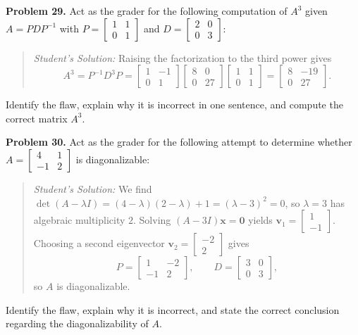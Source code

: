 \documentclass[11pt, letterpaper]{article}
\theoremstyle{definition}
\theoremstyle{remark}
\begin{document}
\textbf{Problem 29.}\label{prob:29}
Act as the grader for the following computation of $A^{3}$ given $A = PDP^{-1}$ with $P = \begin{bmatrix} 1 & 1 \\ 0 & 1 \end{bmatrix}$ and $D = \begin{bmatrix} 2 & 0 \\ 0 & 3 \end{bmatrix}$:
\begin{quote}
\emph{Student's Solution:} Raising the factorization to the third power gives
\[
A^{3} = P^{-1}D^{3}P = \begin{bmatrix} 1 & -1 \\ 0 & 1 \end{bmatrix} \begin{bmatrix} 8 & 0 \\ 0 & 27 \end{bmatrix} \begin{bmatrix} 1 & 1 \\ 0 & 1 \end{bmatrix} = \begin{bmatrix} 8 & -19 \\ 0 & 27 \end{bmatrix}.
\]
\end{quote}
Identify the flaw, explain why it is incorrect in one sentence, and compute the correct matrix $A^{3}$.

\textbf{Problem 30.}\label{prob:30}
Act as the grader for the following attempt to determine whether $A = \begin{bmatrix} 4 & 1 \\ -1 & 2 \end{bmatrix}$ is diagonalizable:
\begin{quote}
\emph{Student's Solution:} We find $\det(A - \lambda I) = (4-\lambda)(2-\lambda) + 1 = (\lambda - 3)^{2} = 0$, so $\lambda = 3$ has algebraic multiplicity $2$. Solving $(A - 3I)\mathbf{x} = \mathbf{0}$ yields $\mathbf{v}_{1} = \begin{bmatrix} 1 \\ -1 \end{bmatrix}$. Choosing a second eigenvector $\mathbf{v}_{2} = \begin{bmatrix} -2 \\ 2 \end{bmatrix}$ gives
\[
P = \begin{bmatrix} 1 & -2 \\ -1 & 2 \end{bmatrix}, \qquad D = \begin{bmatrix} 3 & 0 \\ 0 & 3 \end{bmatrix},
\]
so $A$ is diagonalizable.
\end{quote}
Identify the flaw, explain why it is incorrect, and state the correct conclusion regarding the diagonalizability of $A$.
\end{document}
